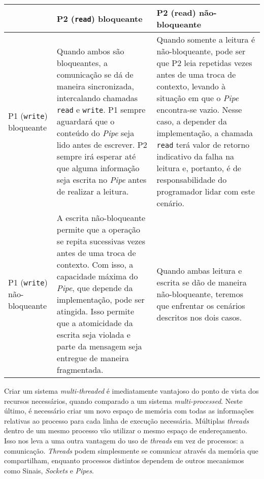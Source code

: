 \begin{answer}
    \begin{center}
    \begin{tabular}{| l | p{5cm} | p{5cm} |}
        \hline
        ~ & P2 (\texttt{read}) bloqueante & P2 (read) não-bloqueante\\
        \hline
        P1 (\texttt{write}) bloqueante  & %
        Quando ambos são bloqueantes, a comunicação se dá de maneira sincronizada, intercalando chamadas \texttt{read} e \texttt{write}. P1 sempre aguardará que o conteúdo do \textit{Pipe} seja lido antes de escrever. P2 sempre irá esperar até que alguma informação seja escrita no \textit{Pipe} antes de realizar a leitura.%
        & %
        Quando somente a leitura é não-bloqueante, pode ser que P2 leia repetidas vezes antes de uma troca de contexto, levando à situação em que o \textit{Pipe} encontra-se vazio. Nesse caso, a depender da implementação, a chamada \texttt{read} terá valor de retorno indicativo da falha na leitura e, portanto, é de responsabilidade do programador lidar com este cenário.
        \\%
        \hline
        P1 (\texttt{write}) não-bloqueante & %
        A escrita não-bloqueante permite que a operação se repita sucessivas vezes antes de uma troca de contexto. Com isso, a capacidade máxima do \textit{Pipe}, que depende da implementação, pode ser atingida. Isso permite que a atomicidade da escrita seja violada e parte da mensagem seja entregue de maneira fragmentada.
        & %
        Quando ambas leitura e escrita se dão de maneira não-bloqueante, teremos que enfrentar os cenários descritos nos dois casos.
        \\ %
        \hline
    \end{tabular}
    \end{center}
\end{answer}

\quest*{}%

\begin{answer}
    Criar um sistema \textit{multi-threaded} é imediatamente vantajoso do ponto de vista dos recursos necessários, quando comparado a um sistema \textit{multi-processed}. Neste último, é necessário criar um novo espaço de memória com todas as informações relativas ao processo para cada linha de execução necessária. Múltiplas \textit{threads} dentro de um mesmo processo vão utilizar o mesmo espaço de endereçamento. Isso nos leva a uma outra vantagem do uso de \textit{threads} em vez de processos: a comunicação. \textit{Threads} podem simplesmente se comunicar através da memória que compartilham, enquanto processos distintos dependem de outros mecanismos como Sinais, \textit{Sockets} e \textit{Pipes}.
\end{answer}

